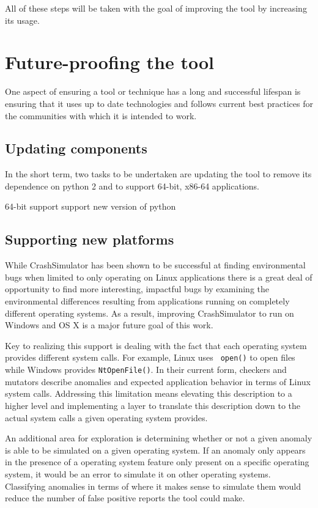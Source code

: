 \documentclass[twocolumn]{article}
\begin{document}
All of these steps will be taken with the goal of improving the tool by
increasing its usage.

\section{Future-proofing the tool}

One aspect of ensuring a tool or technique has a long and successful
lifespan is ensuring that it uses up to date technologies and follows
current best practices for the communities with which it is intended to
work.



\subsection{Updating components}

In the short term, two tasks to be undertaken are updating the tool to
remove its dependence on python 2 and to support 64-bit, x86-64
applications.

64-bit support
support new version of python

\subsection{Supporting new platforms}

While CrashSimulator has been shown to be successful at finding
environmental bugs when limited to only operating on Linux applications
there is a great deal of opportunity to find more interesting, impactful
bugs by examining the environmental differences resulting from applications
running on completely different operating systems.  As a result, improving
CrashSimulator to run on Windows and OS X is a major future goal of this
work.

Key to realizing this support is dealing with the fact that each operating
system provides different system calls.  For example, Linux uses {\tt
open()} to open files while Windows provides {\tt NtOpenFile()}.  In their
current form, checkers and mutators describe anomalies and expected
application behavior in terms of Linux system calls.  Addressing this
limitation means elevating this description to a higher level and
implementing a layer to translate this description down to the actual
system calls a given operating system provides.

An additional area for exploration is determining whether or not a given
anomaly is able to be simulated on a given operating system.  If an anomaly
only appears in the presence of a operating system feature only present on
a specific operating system, it would be an error to simulate it on other
operating systems.  Classifying anomalies in terms of where it makes sense
to simulate them would reduce the number of false positive reports the tool
could make.
\end{document}
